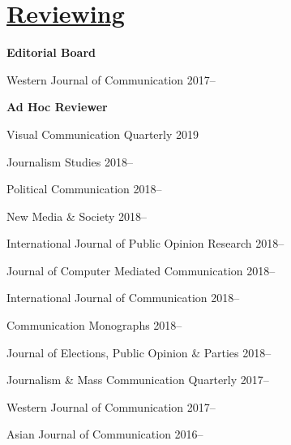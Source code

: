 \section{\href{https://publons.com/researcher/1596852/michael-w-kearney/peer-review/}{Reviewing}}

  \textbf{Editorial Board}
    \begin{innerlist}
      \item Western Journal of Communication                         \hfill 2017--
    \end{innerlist}\vspace{1em}

  \textbf{Ad Hoc Reviewer}
    \begin{innerlist}
      \item Visual Communication Quarterly                           \hfill 2019
      \item Journalism Studies                                       \hfill 2018--
      \item Political Communication                                  \hfill 2018--
      \item New Media \& Society                                     \hfill 2018--
      \item International Journal of Public Opinion Research         \hfill 2018--
      \item Journal of Computer Mediated Communication               \hfill 2018--
      \item International Journal of Communication                   \hfill 2018--
      \item Communication Monographs                                 \hfill 2018--
      \item Journal of Elections, Public Opinion \& Parties          \hfill 2018--
      \item Journalism \& Mass Communication Quarterly               \hfill 2017--
      \item Western Journal of Communication                         \hfill 2017--
      \item Asian Journal of Communication                           \hfill 2016--
    \end{innerlist}\vspace{-.075in}
